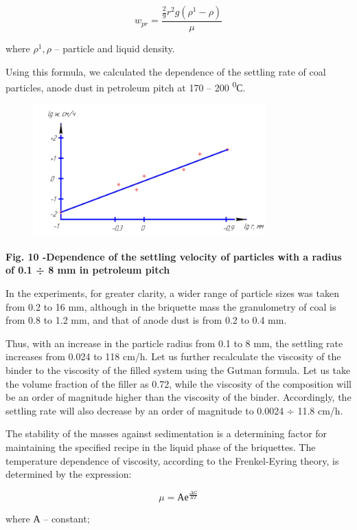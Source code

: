 \[w_{pr} = \frac{\frac{2}{9}r^{2}g\left( \rho^{1} - \rho \right)}{\mu}\]

where \(\rho^{1},\rho\) -- particle and liquid density.

Using this formula, we calculated the dependence of the settling rate of
coal particles, anode dust in petroleum pitch at 170 -- 200
\textsuperscript{0}С.

\begin{figure}[H]
	\centering
	\includegraphics[width=0.8\textwidth]{media/gorn2/image13}
	\caption*{}
\end{figure}


{\bfseries Fig. 10 -Dependence of the settling velocity of particles with a
radius of 0.1 ÷ 8 mm in petroleum pitch}

In the experiments, for greater clarity, a wider range of particle sizes
was taken from 0.2 to 16 mm, although in the briquette mass the
granulometry of coal is from 0.8 to 1.2 mm, and that of anode dust is
from 0.2 to 0.4 mm.

Thus, with an increase in the particle radius from 0.1 to 8 mm, the
settling rate increases from 0.024 to 118 cm/h. Let us further
recalculate the viscosity of the binder to the viscosity of the filled
system using the Gutman formula. Let us take the volume fraction of the
filler as 0.72, while the viscosity of the composition will be an order
of magnitude higher than the viscosity of the binder. Accordingly, the
settling rate will also decrease by an order of magnitude to 0.0024 ÷
11.8 cm/h.

The stability of the masses against sedimentation is a determining
factor for maintaining the specified recipe in the liquid phase of the
briquettes. The temperature dependence of viscosity, according to the
Frenkel-Eyring theory, is determined by the expression:

\[\mu = Ае^{\frac{\Delta G}{RT}}\]

where А -- constant;

